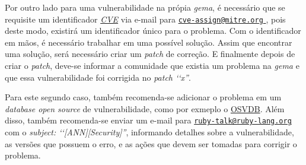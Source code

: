 Por outro lado para uma vulnerabilidade na própia \emph{gema}, é necessário que se requisite um
identificador \emph{\href{https://cve.mitre.org/}{CVE}} via e-mail para
\href{mailto:cve-assign@mitre.org}{\nolinkurl{cve-assign@mitre.org} }, pois deste modo, existirá
um identificador único para o problema. Com o identificador em mãos, é necessário trabalhar em uma
possível solução. Assim que encontrar uma solução, será necessário criar um \emph{patch} de correção.
E finalmente depois de criar o \emph{patch}, deve-se informar a comunidade que existia um problema na
\emph{gema} e que essa vulnerabilidade foi corrigida no \emph{patch ‘‘x''}.

Para este segundo caso, também recomenda-se adicionar o problema em um \emph{database open source}
de vulnerabilidade, como por exmeplo o \href{http://osvdb.org/}{OSVDB}. Além disso, também recomenda-se
enviar um e-mail para \href{mailto:ruby-talk@ruby-lang.org} {\nolinkurl{ruby-talk@ruby-lang.org} } com o
\emph{subject: ‘‘[ANN][Security]''}, informando detalhes sobre a vulnerabilidade, as versões que
possuem o erro, e as ações que devem ser tomadas para corrigir o problema.